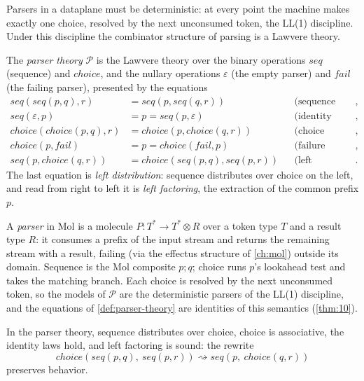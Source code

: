 Parsers in a dataplane must be deterministic: at every point the machine
makes exactly one choice, resolved by the next unconsumed token, the LL(1)
discipline. Under this discipline the combinator structure of parsing is a
Lawvere theory.

\begin{definition}
\label{def:parser-theory}
The \emph{parser theory} $\mathcal{P}$ is the Lawvere theory over the
binary operations $\mathit{seq}$ (sequence) and $\mathit{choice}$, and the
nullary operations $\varepsilon$ (the empty parser) and $\mathit{fail}$
(the failing parser), presented by the equations
\begin{align}
\mathit{seq} (\mathit{seq} (p,q),r) &= \mathit{seq} (p,\mathit{seq} (q,r))
&&\text{(sequence associative)},\\
\mathit{seq} (\varepsilon,p) &= p = \mathit{seq} (p,\varepsilon)
&&\text{(identity laws)},\\
\mathit{choice} (\mathit{choice} (p,q),r) &= \mathit{choice} (p,\mathit{choice} (q,r))
&&\text{(choice associative)},\\
\mathit{choice} (p,\mathit{fail}) &= p = \mathit{choice} (\mathit{fail},p)
&&\text{(failure identity)},\\
\mathit{seq} (p,\mathit{choice} (q,r)) &= \mathit{choice} (\mathit{seq} (p,q),\mathit{seq} (p,r))
&&\text{(left distribution)}.
\end{align}
The last equation is \emph{left distribution}: sequence distributes over
choice on the left, and read from right to left it is \emph{left
factoring}, the extraction of the common prefix $p$.
\end{definition}

A \emph{parser} in Mol is a molecule $P : T^{*} \to T^{*} \otimes R$ over
a token type $T$ and a result type $R$: it consumes a prefix of the input
stream and returns the remaining stream with a result, failing (via the
effectus structure of \autoref{ch:mol}) outside its domain. Sequence is the
Mol composite $p;q$; choice runs $p$'s lookahead test and takes the
matching branch. Each choice is resolved by the next unconsumed token, so
the models of $\mathcal{P}$ are the deterministic parsers of the LL(1)
discipline, and the equations of \autoref{def:parser-theory} are identities
of this semantics (\autoref{thm:10}).

\begin{theorem}\label{thm:10}
In the parser theory, sequence distributes over choice, choice is
associative, the identity laws hold, and left factoring is sound: the
rewrite
\[
\mathit{choice} (\mathit{seq} (p,q),\ \mathit{seq} (p,r)) \rightsquigarrow
\mathit{seq} (p,\ \mathit{choice} (q,r))
\]
preserves behavior.
\end{theorem}

